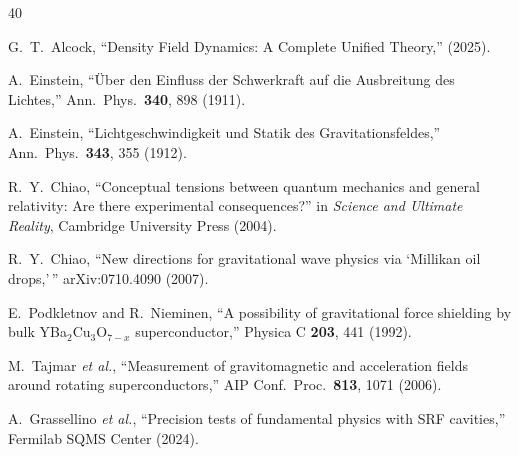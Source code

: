 \documentclass[aps,prd,twocolumn,superscriptaddress,floatfix,nofootinbib]{revtex4-2}
\begin{document}
\begin{thebibliography}{40}

G.~T.~Alcock, ``Density Field Dynamics: A Complete Unified Theory,''
(2025).

A.~Einstein, ``\"Uber den Einfluss der Schwerkraft auf die
Ausbreitung des Lichtes,''
Ann.\ Phys.\ \textbf{340}, 898 (1911).

A.~Einstein, ``Lichtgeschwindigkeit und Statik des Gravitationsfeldes,''
Ann.\ Phys.\ \textbf{343}, 355 (1912).

R.~Y.~Chiao, ``Conceptual tensions between quantum mechanics and
general relativity: Are there experimental consequences?''
in \textit{Science and Ultimate Reality}, Cambridge University Press
(2004).

R.~Y.~Chiao, ``New directions for gravitational wave physics via
`Millikan oil drops,'\,''
arXiv:0710.4090 (2007).

E.~Podkletnov and R.~Nieminen, ``A possibility of gravitational force
shielding by bulk YBa$_2$Cu$_3$O$_{7-x}$ superconductor,''
Physica C \textbf{203}, 441 (1992).

M.~Tajmar \textit{et al.}, ``Measurement of gravitomagnetic and
acceleration fields around rotating superconductors,''
AIP Conf.\ Proc.\ \textbf{813}, 1071 (2006).

A.~Grassellino \textit{et al.}, ``Precision tests of fundamental
physics with SRF cavities,'' Fermilab SQMS Center (2024).

\end{thebibliography}
\end{document}
